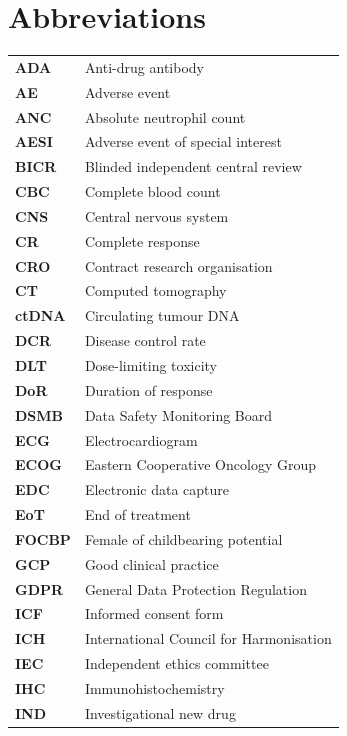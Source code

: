 \section*{Abbreviations}

\renewcommand{\arraystretch}{1.3}
\begin{tabularx}{\linewidth}{@{}>{\bfseries\color{accent}}l@{\hspace{8mm}}>{\raggedright\arraybackslash}X@{}}
  ADA & Anti-drug antibody \\
  AE  & Adverse event \\
  ANC & Absolute neutrophil count \\
  AESI & Adverse event of special interest \\
  BICR & Blinded independent central review \\
  CBC & Complete blood count \\
  CNS & Central nervous system \\
  CR  & Complete response \\
  CRO & Contract research organisation \\
  CT  & Computed tomography \\
  ctDNA & Circulating tumour DNA \\
  DCR & Disease control rate \\
  DLT & Dose-limiting toxicity \\
  DoR & Duration of response \\
  DSMB & Data Safety Monitoring Board \\
  ECG & Electrocardiogram \\
  ECOG & Eastern Cooperative Oncology Group \\
  EDC & Electronic data capture \\
  EoT & End of treatment \\
  FOCBP & Female of childbearing potential \\
  GCP & Good clinical practice \\
  GDPR & General Data Protection Regulation \\
  ICF & Informed consent form \\
  ICH & International Council for Harmonisation \\
  IEC & Independent ethics committee \\
  IHC & Immunohistochemistry \\
  IND & Investigational new drug \\

\end{tabularx}
